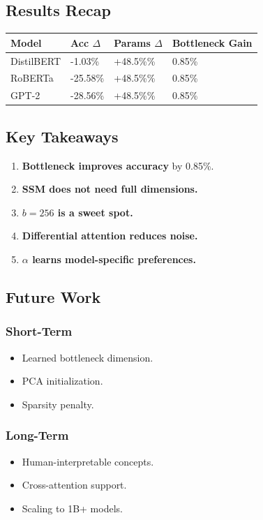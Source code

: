 \subsection{Results Recap}

\begin{table}[H]
\centering
\small
\begin{tabular}{llll}
\toprule
\textbf{Model} & \textbf{Acc $\Delta$} & \textbf{Params $\Delta$} & \textbf{Bottleneck Gain} \\
\midrule
DistilBERT & -1.03\% & +48.5\%\% & 0.85\% \\
RoBERTa & -25.58\% & +48.5\%\% & 0.85\% \\
GPT-2 & -28.56\% & +48.5\%\% & 0.85\% \\
\bottomrule
\end{tabular}
\end{table}

\subsection{Key Takeaways}

\begin{enumerate}
\item \textbf{Bottleneck improves accuracy} by 0.85\%.
\item \textbf{SSM does not need full dimensions.}
\item \textbf{$b = 256$ is a sweet spot.}
\item \textbf{Differential attention reduces noise.}
\item \textbf{$\alpha$ learns model-specific preferences.}

\end{enumerate}
\subsection{Future Work}

\subsubsection{Short-Term}
\begin{itemize}
\item Learned bottleneck dimension.
\item PCA initialization.
\item Sparsity penalty.

\end{itemize}
\subsubsection{Long-Term}
\begin{itemize}
\item Human-interpretable concepts.
\item Cross-attention support.
\item Scaling to 1B+ models.

\end{itemize}
